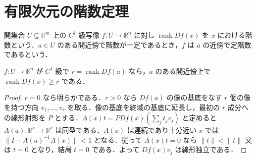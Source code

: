 \section{有限次元の階数定理}
\begin{defn}[微分の階数と定階数]
開集合 $U\subseteq\mathbb R^m$ 上の $C^1$ 級写像 $f:U\to\mathbb R^n$ に対し $\operatorname{rank}Df(x)$ を $x$ における階数という．$a\in U$ のある開近傍で階数が一定であるとき，$f$ は $a$ の近傍で定階数であるという．
\end{defn}
\begin{prop}[階数の局所下半連続性]
$f:U\to\mathbb R^n$ が $C^1$ 級で $r=\operatorname{rank}Df(a)$ なら，$a$ のある開近傍上で $\operatorname{rank}Df(x)\geq r$ である．
\end{prop}
\begin{proof}
$r=0$ なら明らかである．$r>0$ なら $Df(a)$ の像の基底をなす $r$ 個の像を持つ方向 $v_1,\ldots,v_r$ を取る．像の基底を終域の基底に延長し，最初の $r$ 成分への線形射影を $P$ とする．$A(x)t=P Df(x)(\sum_jt_jv_j)$ と定めると $A(a):\mathbb R^r\to\mathbb R^r$ は同型である．$A(x)$ は連続であり十分近い $x$ では $\|I-A(a)^{-1}A(x)\|<1$ となる．従って $A(x)t=0$ なら $\|t\|<\|t\|$ 又は $t=0$ となり，結局 $t=0$ である．よって $Df(x)v_j$ は線形独立である．
\end{proof}
